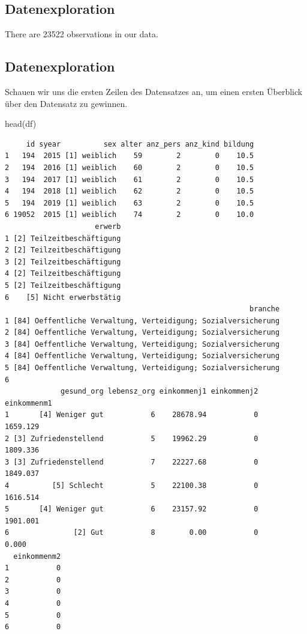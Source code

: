 \documentclass[
  letterpaper,
  DIV=11,
  numbers=noendperiod]{scrartcl}
\newenvironment{Shaded}{\begin{snugshade}}{\end{snugshade}}
\newcommand{\FunctionTok}[1]{\textcolor[rgb]{0.28,0.35,0.67}{#1}}
\newcommand{\NormalTok}[1]{\textcolor[rgb]{0.00,0.23,0.31}{#1}}
\begin{document}
\subsection{Datenexploration}\label{datenexploration}

There are 23522 observations in our data.

\subsection{Datenexploration}\label{datenexploration-1}

Schauen wir uns die ersten Zeilen des Datensatzes an, um einen ersten
Überblick über den Datensatz zu gewinnen.

\begin{Shaded}
\begin{Highlighting}[]
\FunctionTok{head}\NormalTok{(df)}
\end{Highlighting}
\end{Shaded}

\begin{verbatim}
     id syear          sex alter anz_pers anz_kind bildung
1   194  2015 [1] weiblich    59        2        0    10.5
2   194  2016 [1] weiblich    60        2        0    10.5
3   194  2017 [1] weiblich    61        2        0    10.5
4   194  2018 [1] weiblich    62        2        0    10.5
5   194  2019 [1] weiblich    63        2        0    10.5
6 19052  2015 [1] weiblich    74        2        0    10.0
                     erwerb
1 [2] Teilzeitbeschäftigung
2 [2] Teilzeitbeschäftigung
3 [2] Teilzeitbeschäftigung
4 [2] Teilzeitbeschäftigung
5 [2] Teilzeitbeschäftigung
6    [5] Nicht erwerbstätig
                                                         branche
1 [84] Oeffentliche Verwaltung, Verteidigung; Sozialversicherung
2 [84] Oeffentliche Verwaltung, Verteidigung; Sozialversicherung
3 [84] Oeffentliche Verwaltung, Verteidigung; Sozialversicherung
4 [84] Oeffentliche Verwaltung, Verteidigung; Sozialversicherung
5 [84] Oeffentliche Verwaltung, Verteidigung; Sozialversicherung
6                                                               
             gesund_org lebensz_org einkommenj1 einkommenj2 einkommenm1
1       [4] Weniger gut           6    28678.94           0    1659.129
2 [3] Zufriedenstellend           5    19962.29           0    1809.336
3 [3] Zufriedenstellend           7    22227.68           0    1849.037
4          [5] Schlecht           5    22100.38           0    1616.514
5       [4] Weniger gut           6    23157.92           0    1901.001
6               [2] Gut           8        0.00           0       0.000
  einkommenm2
1           0
2           0
3           0
4           0
5           0
6           0
\end{verbatim}
\end{document}
